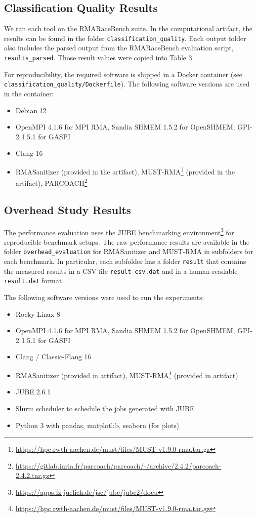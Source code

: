 \documentclass[twoside]{article}
\begin{document}
\subsection*{Classification Quality Results}
We ran each tool on the RMARaceBench suite. 
In the computational artifact, the results can be found in the folder \texttt{classification\_quality}.
Each output folder also includes the parsed output from the RMARaceBench evaluation script, \texttt{results\_parsed}.
Those result values were copied into Table 3.

For reproducibility, the required software is shipped in a Docker container (see \texttt{classification\_quality/Dockerfile}). The following software versions are used in the container:
\begin{itemize}
\item Debian 12
\item OpenMPI 4.1.6 for MPI RMA, Sandia SHMEM 1.5.2 for OpenSHMEM, GPI-2 1.5.1 for GASPI
\item Clang 16
\item RMASanitizer (provided in the artifact), MUST-RMA\footnote{\url{https://hpc.rwth-aachen.de/must/files/MUST-v1.9.0-rma.tar.gz}} (provided in the artifact), PARCOACH\footnote{\url{https://gitlab.inria.fr/parcoach/parcoach/-/archive/2.4.2/parcoach-2.4.2.tar.gz}}
\end{itemize}


\subsection*{Overhead Study Results}
The performance evaluation uses the JUBE benchmarking environment\footnote{\url{https://apps.fz-juelich.de/jsc/jube/jube2/docu}} for reproducible benchmark setups.
The raw performance results are available in the folder \texttt{overhead\_evaluation} for RMASanitizer and MUST-RMA in subfolders for each benchmark. In particular, each subfolder has a folder  \texttt{result} that contains the measured results in a CSV file \texttt{result\_csv.dat} and in a human-readable \texttt{result.dat} format.

The following software versions were used to run the experiments:
\begin{itemize}
\item Rocky Linux 8
\item OpenMPI 4.1.6 for MPI RMA, Sandia SHMEM 1.5.2 for OpenSHMEM, GPI-2 1.5.1 for GASPI
\item Clang / Classic-Flang 16
\item RMASanitizer (provided in artifact), MUST-RMA\footnote{\url{https://hpc.rwth-aachen.de/must/files/MUST-v1.9.0-rma.tar.gz}} (provided in artifact)
\item JUBE 2.6.1
\item Slurm scheduler to schedule the jobs generated with JUBE
\item Python 3 with pandas, matplotlib, seaborn (for plots)
\end{itemize}
\end{document}
